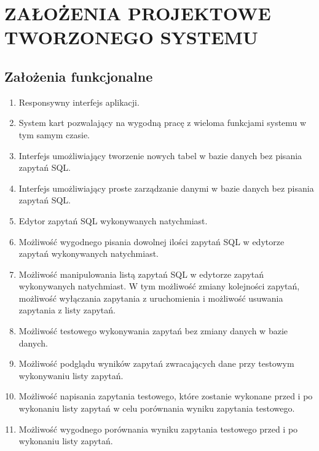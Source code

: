 \section{ZAŁOŻENIA PROJEKTOWE TWORZONEGO SYSTEMU}

\subsection{Założenia funkcjonalne}

\begin{enumerate}

    \item Responsywny interfejs aplikacji.

    \item System kart pozwalający na wygodną pracę z wieloma funkcjami
        systemu w tym samym czasie.

    \item Interfejs umożliwiający tworzenie nowych tabel w bazie danych bez
        pisania zapytań SQL.

    \item Interfejs umożliwiający proste zarządzanie danymi w bazie danych bez
        pisania zapytań SQL.

    \item Edytor zapytań SQL wykonywanych natychmiast.

    \item Możliwość wygodnego pisania dowolnej ilości zapytań SQL w edytorze
        zapytań wykonywanych natychmiast.

    \item Możliwość manipulowania listą zapytań SQL w edytorze zapytań
        wykonywanych natychmiast. W tym możliwość zmiany kolejności zapytań,
        możliwość wyłączania zapytania z uruchomienia i możliwość usuwania
        zapytania z listy zapytań.

    \item Możliwość testowego wykonywania zapytań bez zmiany danych w bazie
        danych.

    \item Możliwość podglądu wyników zapytań zwracających dane przy testowym
        wykonywaniu listy zapytań.

    \item Możliwość napisania zapytania testowego, które zostanie wykonane przed
        i po wykonaniu listy zapytań w celu porównania wyniku zapytania
        testowego.

    \item Możliwość wygodnego porównania wyniku zapytania testowego przed i po
        wykonaniu listy zapytań.


\end{enumerate}
